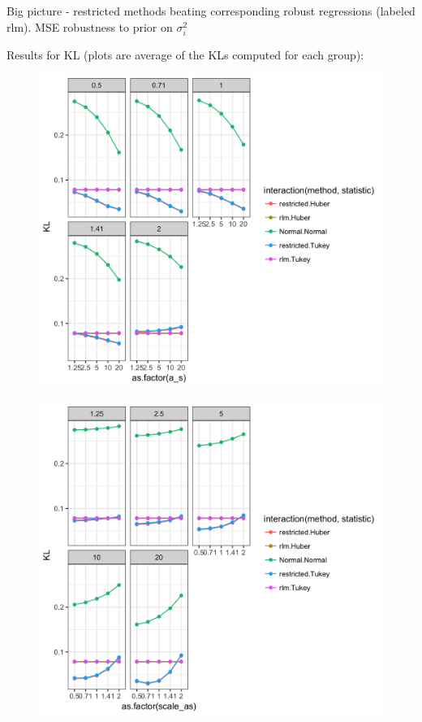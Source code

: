 \documentclass[12pt]{article}
\begin{document}
Big picture - restricted methods beating corresponding robust regressions (labeled rlm). MSE robustness to prior on $\sigma_{i}^{2}$


Results for KL (plots are average of the KLs computed for each group):
\begin{figure}[H]
\centering
\includegraphics[scale = .3]{kl_sim2_facet_scale.png}
\end{figure}


\begin{figure}[H]
\centering
\includegraphics[scale = .3]{kl_sim2_facet_as.png}
\end{figure}
\end{document}
